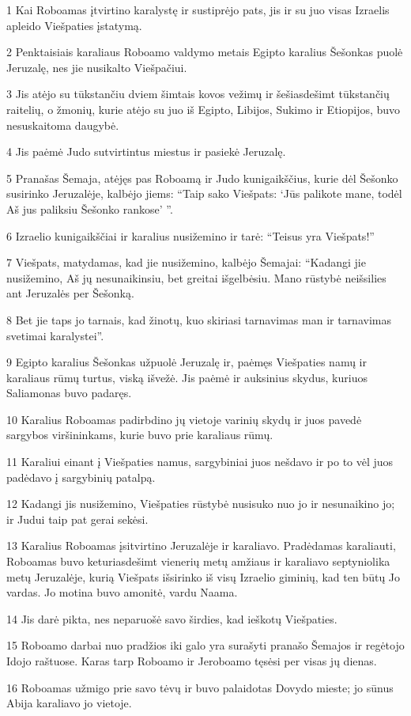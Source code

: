 \par 1 Kai Roboamas įtvirtino karalystę ir sustiprėjo pats, jis ir su juo visas Izraelis apleido Viešpaties įstatymą. 
\par 2 Penktaisiais karaliaus Roboamo valdymo metais Egipto karalius Šešonkas puolė Jeruzalę, nes jie nusikalto Viešpačiui. 
\par 3 Jis atėjo su tūkstančiu dviem šimtais kovos vežimų ir šešiasdešimt tūkstančių raitelių, o žmonių, kurie atėjo su juo iš Egipto, Libijos, Sukimo ir Etiopijos, buvo nesuskaitoma daugybė. 
\par 4 Jis paėmė Judo sutvirtintus miestus ir pasiekė Jeruzalę. 
\par 5 Pranašas Šemaja, atėjęs pas Roboamą ir Judo kunigaikščius, kurie dėl Šešonko susirinko Jeruzalėje, kalbėjo jiems: “Taip sako Viešpats: ‘Jūs palikote mane, todėl Aš jus paliksiu Šešonko rankose’ ”. 
\par 6 Izraelio kunigaikščiai ir karalius nusižemino ir tarė: “Teisus yra Viešpats!” 
\par 7 Viešpats, matydamas, kad jie nusižemino, kalbėjo Šemajai: “Kadangi jie nusižemino, Aš jų nesunaikinsiu, bet greitai išgelbėsiu. Mano rūstybė neišsilies ant Jeruzalės per Šešonką. 
\par 8 Bet jie taps jo tarnais, kad žinotų, kuo skiriasi tarnavimas man ir tarnavimas svetimai karalystei”. 
\par 9 Egipto karalius Šešonkas užpuolė Jeruzalę ir, paėmęs Viešpaties namų ir karaliaus rūmų turtus, viską išvežė. Jis paėmė ir auksinius skydus, kuriuos Saliamonas buvo padaręs. 
\par 10 Karalius Roboamas padirbdino jų vietoje varinių skydų ir juos pavedė sargybos viršininkams, kurie buvo prie karaliaus rūmų. 
\par 11 Karaliui einant į Viešpaties namus, sargybiniai juos nešdavo ir po to vėl juos padėdavo į sargybinių patalpą. 
\par 12 Kadangi jis nusižemino, Viešpaties rūstybė nusisuko nuo jo ir nesunaikino jo; ir Judui taip pat gerai sekėsi. 
\par 13 Karalius Roboamas įsitvirtino Jeruzalėje ir karaliavo. Pradėdamas karaliauti, Roboamas buvo keturiasdešimt vienerių metų amžiaus ir karaliavo septyniolika metų Jeruzalėje, kurią Viešpats išsirinko iš visų Izraelio giminių, kad ten būtų Jo vardas. Jo motina buvo amonitė, vardu Naama. 
\par 14 Jis darė pikta, nes neparuošė savo širdies, kad ieškotų Viešpaties. 
\par 15 Roboamo darbai nuo pradžios iki galo yra surašyti pranašo Šemajos ir regėtojo Idojo raštuose. Karas tarp Roboamo ir Jeroboamo tęsėsi per visas jų dienas. 
\par 16 Roboamas užmigo prie savo tėvų ir buvo palaidotas Dovydo mieste; jo sūnus Abija karaliavo jo vietoje.



